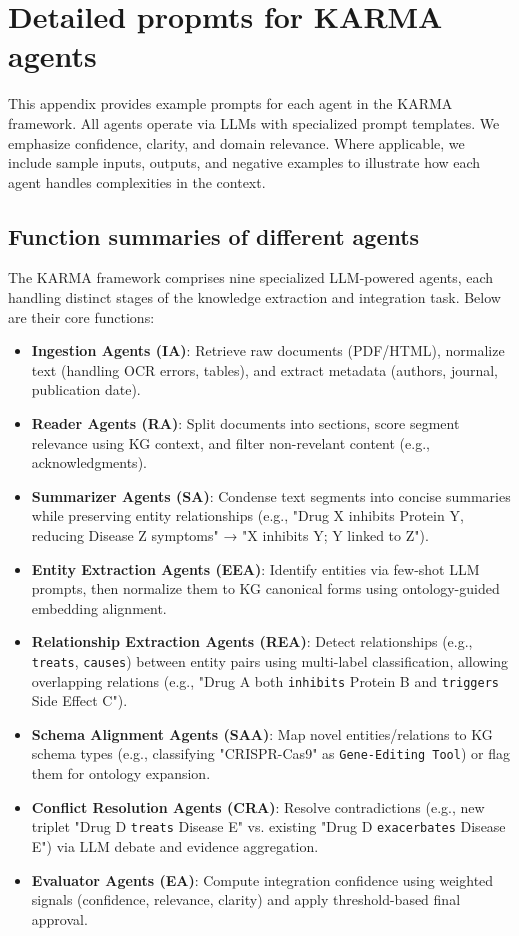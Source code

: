 \documentclass{article}
\begin{document}
\section{Detailed propmts for KARMA agents}
\label{sec:appendix-prompts}

This appendix provides example prompts for each agent in the KARMA framework. All agents operate via LLMs with specialized prompt templates. We emphasize confidence, clarity, and domain relevance. Where applicable, we include sample inputs, outputs, and negative examples to illustrate how each agent handles complexities in the context.

\subsection{Function summaries of different agents}
\label{sec:appendix-agent-introduction}
The KARMA framework comprises nine specialized LLM-powered agents, each handling distinct stages of the knowledge extraction and integration task. Below are their core functions:

\begin{itemize}
\item \textbf{Ingestion Agents (IA)}: Retrieve raw documents (PDF/HTML), normalize text (handling OCR errors, tables), and extract metadata (authors, journal, publication date).
\item \textbf{Reader Agents (RA)}: Split documents into sections, score segment relevance using KG context, and filter non-revelant content (e.g., acknowledgments).
\item \textbf{Summarizer Agents (SA)}: Condense text segments into concise summaries while preserving entity relationships (e.g., "Drug X inhibits Protein Y, reducing Disease Z symptoms" → "X inhibits Y; Y linked to Z").
\item \textbf{Entity Extraction Agents (EEA)}: Identify entities via few-shot LLM prompts, then normalize them to KG canonical forms using ontology-guided embedding alignment.
\item \textbf{Relationship Extraction Agents (REA)}: Detect relationships (e.g., \texttt{treats}, \texttt{causes}) between entity pairs using multi-label classification, allowing overlapping relations (e.g., "Drug A both \texttt{inhibits} Protein B and \texttt{triggers} Side Effect C").
\item \textbf{Schema Alignment Agents (SAA)}: Map novel entities/relations to KG schema types (e.g., classifying "CRISPR-Cas9" as \texttt{Gene-Editing Tool}) or flag them for ontology expansion.
\item \textbf{Conflict Resolution Agents (CRA)}: Resolve contradictions (e.g., new triplet "Drug D \texttt{treats} Disease E" vs. existing "Drug D \texttt{exacerbates} Disease E") via LLM debate and evidence aggregation.
\item \textbf{Evaluator Agents (EA)}: Compute integration confidence using weighted signals (confidence, relevance, clarity) and apply threshold-based final approval.
\end{itemize}
\end{document}
